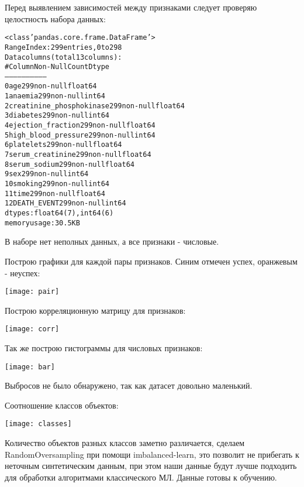 Перед выявлением зависимостей между признаками следует проверяю целостность набора данных:
\begin{alltt}
<class 'pandas.core.frame.DataFrame'>
RangeIndex: 299 entries, 0 to 298
Data columns (total 13 columns):
 #   Column                    Non-Null Count  Dtype  
---  ------                    --------------  -----  
 0   age                       299 non-null    float64
 1   anaemia                   299 non-null    int64  
 2   creatinine_phosphokinase  299 non-null    float64
 3   diabetes                  299 non-null    int64  
 4   ejection_fraction         299 non-null    float64
 5   high_blood_pressure       299 non-null    int64  
 6   platelets                 299 non-null    float64
 7   serum_creatinine          299 non-null    float64
 8   serum_sodium              299 non-null    float64
 9   sex                       299 non-null    int64  
 10  smoking                   299 non-null    int64  
 11  time                      299 non-null    float64
 12  DEATH_EVENT               299 non-null    int64  
dtypes: float64(7), int64(6)
memory usage: 30.5 KB
\end{alltt}

В наборе нет неполных данных, а все признаки - числовые.
\pagebreak

Построю графики для каждой пары признаков. Синим отмечен успех, оранжевым - неуспех:
\begin{center}
\texttt{[image: pair]}
\end{center}\pagebreak

Построю корреляционную матрицу для признаков:
\begin{center}
\texttt{[image: corr]}
\end{center}
Так же построю гистограммы для числовых признаков:
\begin{center}
\texttt{[image: bar]}
\end{center}
Выбросов не было обнаружено, так как датасет довольно маленький.
\pagebreak

Соотношение классов объектов:
\begin{center}
\texttt{[image: classes]}
\end{center}
Количество объектов разных классов заметно различается, сделаем RandomOversampling при помощи imbalanced-learn, это позволит не прибегать
к неточным синтетическим данным, при этом наши данные будут лучше подходить для обработки алгоритмами классического МЛ. 
Данные готовы к обучению.

\pagebreak
